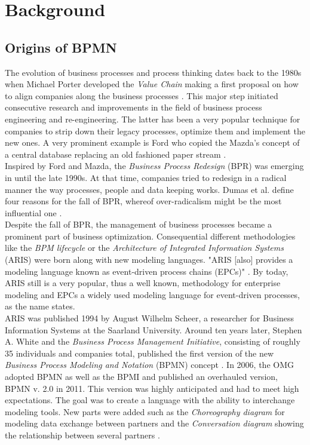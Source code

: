 \chapter{Background}
\label{chapter:background}

\section{Origins of BPMN}
The evolution of business processes and process thinking dates back to the 1980s when Michael Porter developed the \textit{Value Chain} making a first proposal on how to align companies along the business processes \cite{Porter1988}. 
This major step initiated consecutive research and improvements in the field of business process engineering and re-engineering. The latter has been a very popular technique for companies to strip down their legacy processes, optimize them and implement the new ones. A very prominent example is Ford who copied the Mazda's concept of a central database replacing an old fashioned paper stream \cite{Dumas2013}. \\
Inspired by Ford and Mazda, the \textit{Business Process Redesign} (BPR) was emerging in until the late 1990s. At that time, companies tried to redesign in a radical manner the way processes, people and data keeping works. Dumas et al. define four reasons for the fall of BPR, whereof over-radicalism might be the most influential one \cite{Dumas2013}. \\

Despite the fall of BPR, the management of business processes became a prominent part of business optimization. Consequential different methodologies like the \textit{BPM lifecycle} or the \textit{Architecture of Integrated Information Systems} (ARIS) were born along with new modeling languages. "ARIS [also] provides a modeling language known as event-driven process chains (EPCs)" \cite{Lankhorst2009}. By today, ARIS still is a very popular, thus a well known, methodology for enterprise modeling and EPCs a widely used modeling language for event-driven processes, as the name states. \\
ARIS was published 1994 by August Wilhelm Scheer, a researcher for Business Information Systems at the Saarland University. Around ten years later, Stephen A. White and the \textit{Business Process Management Initiative}, consisting of roughly 35 individuals and companies total, published the first version of the new \textit{Business Process Modeling and Notation} (BPMN) concept \cite{Allweyer2010}. In 2006, the OMG adopted BPMN as well as the BPMI and published an overhauled version, BPMN v. 2.0 in 2011. This version was highly anticipated and had to meet high expectations. The goal was to create a language with the ability to interchange modeling tools. New parts were added such as the \textit{Choreography diagram} for modeling data exchange between partners and the \textit{Conversation diagram} showing the relationship between several partners \cite{Allweyer2010}. 

